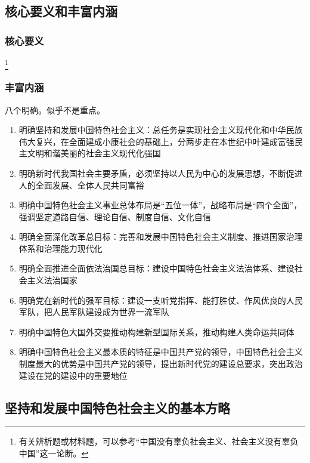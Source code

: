     \subsection{核心要义和丰富内涵}
        \subsubsection{核心要义}
        \footnote{有关辨析题或材料题，可以参考“中国没有辜负社会主义、社会主义没有辜负中国”这一论断。}

        \subsubsection{丰富内涵}
        八个明确。似乎不是重点。
        \begin{enumerate}
            \item 明确坚持和发展中国特色社会主义：总任务是实现社会主义现代化和中华民族伟大复兴，在全面建成小康社会的基础上，分两步走在本世纪中叶建成富强民主文明和谐美丽的社会主义现代化强国
            \item 明确新时代我国社会主要矛盾，必须坚持以人民为中心的发展思想，不断促进人的全面发展、全体人民共同富裕
            \item 明确中国特色社会主义事业总体布局是“五位一体”，战略布局是“四个全面”，强调坚定道路自信、理论自信、制度自信、文化自信
            \item 明确全面深化改革总目标：完善和发展中国特色社会主义制度、推进国家治理体系和治理能力现代化
            \item 明确全面推进全面依法治国总目标：建设中国特色社会主义法治体系、建设社会主义法治国家
            \item 明确党在新时代的强军目标：建设一支听党指挥、能打胜仗、作风优良的人民军队，把人民军队建设成为世界一流军队
            \item 明确中国特色大国外交要推动构建新型国际关系，推动构建人类命运共同体
            \item 明确中国特色社会主义最本质的特征是中国共产党的领导，中国特色社会主义制度最大的优势是中国共产党的领导，提出新时代党的建设总要求，突出政治建设在党的建设中的重要地位
        \end{enumerate}

    \subsection{坚持和发展中国特色社会主义的基本方略}
